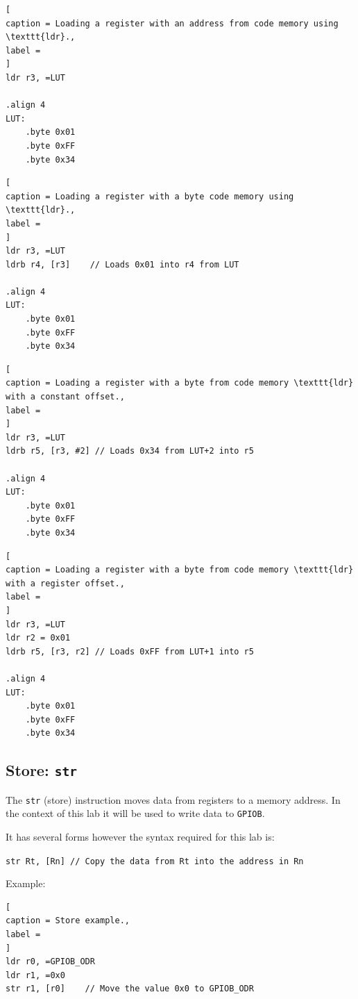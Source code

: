 \documentclass{UoNMCHA}
\numberwithin{equation}{section}
\begin{document}
\begin{lstlisting}[
caption = Loading a register with an address from code memory using \texttt{ldr}.,
label = 
]
ldr r3, =LUT

.align 4
LUT:
    .byte 0x01
    .byte 0xFF
    .byte 0x34
\end{lstlisting}

\begin{lstlisting}[
caption = Loading a register with a byte code memory using \texttt{ldr}.,
label = 
]
ldr r3, =LUT
ldrb r4, [r3]    // Loads 0x01 into r4 from LUT

.align 4
LUT:
    .byte 0x01
    .byte 0xFF
    .byte 0x34
\end{lstlisting}

\begin{lstlisting}[
caption = Loading a register with a byte from code memory \texttt{ldr} with a constant offset.,
label = 
]
ldr r3, =LUT
ldrb r5, [r3, #2] // Loads 0x34 from LUT+2 into r5

.align 4
LUT:
    .byte 0x01
    .byte 0xFF
    .byte 0x34
\end{lstlisting}

\begin{lstlisting}[
caption = Loading a register with a byte from code memory \texttt{ldr} with a register offset.,
label = 
]
ldr r3, =LUT
ldr r2 = 0x01
ldrb r5, [r3, r2] // Loads 0xFF from LUT+1 into r5

.align 4
LUT:
    .byte 0x01
    .byte 0xFF
    .byte 0x34
\end{lstlisting}

\subsection{Store: \texttt{str}}

The \texttt{str} (store) instruction moves data from registers to a memory address. In the context of this lab it will be used to write data to \texttt{GPIOB}.

It has several forms however the syntax required for this lab is:

\texttt{str Rt, [Rn]    // Copy the data from Rt into the address in Rn}

Example:

\begin{lstlisting}[
caption = Store example.,
label = 
]
ldr r0, =GPIOB_ODR
ldr r1, =0x0
str r1, [r0]    // Move the value 0x0 to GPIOB_ODR
\end{lstlisting}
\end{document}
